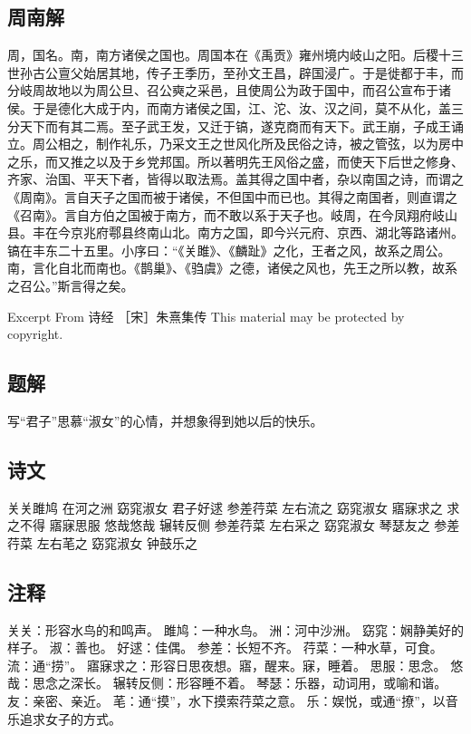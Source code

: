 \documentclass[
]{book}
\theoremstyle{definition}
\theoremstyle{definition}
\theoremstyle{definition}
\theoremstyle{definition}
\theoremstyle{remark}
\begin{document}
\hypertarget{ux5468ux5357ux89e3}{%
\subsection{周南解}\label{ux5468ux5357ux89e3}}

周，国名。南，南方诸侯之国也。周国本在《禹贡》雍州境内岐山之阳。后稷十三世孙古公亶父始居其地，传子王季历，至孙文王昌，辟国浸广。于是徙都于丰，而分岐周故地以为周公旦、召公奭之采邑，且使周公为政于国中，而召公宣布于诸侯。于是德化大成于内，而南方诸侯之国，江、沱、汝、汉之间，莫不从化，盖三分天下而有其二焉。至子武王发，又迁于镐，遂克商而有天下。武王崩，子成王诵立。周公相之，制作礼乐，乃采文王之世风化所及民俗之诗，被之管弦，以为房中之乐，而又推之以及于乡党邦国。所以著明先王风俗之盛，而使天下后世之修身、齐家、治国、平天下者，皆得以取法焉。盖其得之国中者，杂以南国之诗，而谓之《周南》。言自天子之国而被于诸侯，不但国中而已也。其得之南国者，则直谓之《召南》。言自方伯之国被于南方，而不敢以系于天子也。岐周，在今凤翔府岐山县。丰在今京兆府鄠县终南山北。南方之国，即今兴元府、京西、湖北等路诸州。镐在丰东二十五里。小序曰：``《关雎》、《麟趾》之化，王者之风，故系之周公。南，言化自北而南也。《鹊巢》、《驺虞》之德，诸侯之风也，先王之所以教，故系之召公。''斯言得之矣。

Excerpt From
诗经
［宋］朱熹集传
This material may be protected by copyright.

\hypertarget{ux9898ux89e3}{%
\subsection{题解}\label{ux9898ux89e3}}

写``君子''思慕``淑女''的心情，并想象得到她以后的快乐。

\hypertarget{ux8bd7ux6587}{%
\subsection{诗文}\label{ux8bd7ux6587}}

关关雎鸠 在河之洲
窈窕淑女 君子好逑
参差荇菜 左右流之
窈窕淑女 寤寐求之
求之不得 寤寐思服
悠哉悠哉 辗转反侧
参差荇菜 左右采之
窈窕淑女 琴瑟友之
参差荇菜 左右芼之
窈窕淑女 钟鼓乐之

\hypertarget{ux6ce8ux91ca}{%
\subsection{注释}\label{ux6ce8ux91ca}}

关关：形容水鸟的和鸣声。 雎鸠：一种水鸟。 洲：河中沙洲。
窈窕：娴静美好的样子。 淑：善也。 好逑：佳偶。
参差：长短不齐。 荇菜：一种水草，可食。
流：通``捞''。
寤寐求之：形容日思夜想。寤，醒来。寐，睡着。
思服：思念。
悠哉：思念之深长。 辗转反侧：形容睡不着。
琴瑟：乐器，动词用，或喻和谐。 友：亲密、亲近。
芼：通``摸''，水下摸索荇菜之意。
乐：娱悦，或通``撩''，以音乐追求女子的方式。
\end{document}
